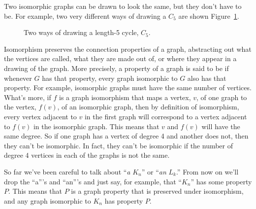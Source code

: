 \begin{editingnotes}
\end{editingnotes}

Two isomorphic graphs can be drawn to look the same, but
they don't have to be.  For example, two very different ways of drawing a
$C_5$ are shown Figure~\ref{fig:isomorphism-c5}.

\begin{figure}


\caption{Two ways of drawing a length-5 cycle, $C_5$.}
\label{fig:isomorphism-c5}
\end{figure}

Isomorphism preserves the connection properties of a graph,
abstracting out what the vertices are called, what they are made out
of, or where they appear in a drawing of the graph.  More precisely, a
property of a graph is said to be 
if whenever $G$ has that property, every graph isomorphic to $G$ also
has that property.  For example, isomorphic graphs must have the same
number of vertices.  What's more, if $f$ is a graph isomorphism that
maps a vertex, $v$, of one graph to the vertex, $f(v)$, of an
isomorphic graph, then by definition of isomorphism, every vertex
adjacent to $v$ in the first graph will correspond to a vertex
adjacent to $f(v)$ in the isomorphic graph.  This means that $v$ and
$f(v)$ will have the same degree.  So if one graph has a vertex of
degree 4 and another does not, then they can't be isomorphic.  In
fact, they can't be isomorphic if the number of degree 4 vertices in
each of the graphs is not the same.

\begin{editingnotes}
\end{editingnotes}
So far we've been careful to talk about ``\emph{a} $K_n$'' or
``\emph{an} $L_k$.''  From now on we'll drop the ``a'''s and ``an'''s
and just say, for example, that ``$K_n$'' has some property $P$.  This
means that $P$ is a graph property that is preserved under isomorphism,
and any graph isomorphic to $K_n$ has property $P$.

